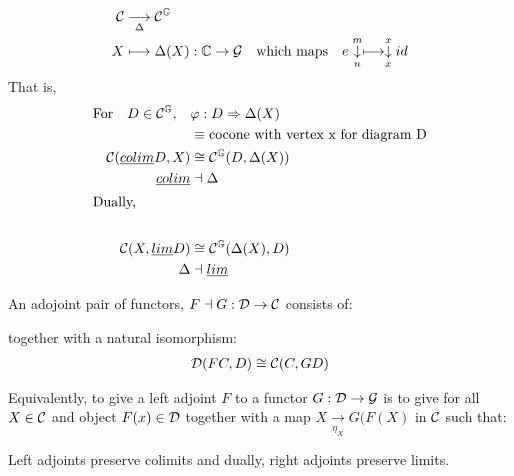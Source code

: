\begin{example}[Colimits]
  \begin{align*}
    \mathcal{C} &\underset{\Delta}{\longrightarrow} \mathcal{C}^\mathbb{G} \\ 
    X &\longmapsto \Delta(X): \mathbb{C} \to \mathcal{G} \quad 
    \textrm{which maps} \quad
    e \overset{m}{\underset{n}{\downarrow}} \longmapsto
    \overset{x}{\underset{x}{\downarrow}}id
  \end{align*} 
That is, 
  \begin{align*}
    \textrm{For} \quad D \in \mathcal{C}^\mathbb{G},  \quad
    &\varphi: D \Rightarrow \Delta(X) \\
    &\equiv \textrm{cocone with vertex x for diagram D} \\
    \mathcal{C}(\underline{colim}D, X) &\cong 
      \mathcal{C}^{\mathbb{G}}(D, \Delta(X)) \\ 
    \underline{colim} &\dashv \Delta \\ 
    \shortintertext{Dually,} \\ 
    \mathcal{C}(X, \underline{lim}D) &\cong
      \mathcal{C}^{\mathbb{G}}(\Delta(X), D) \\
    \Delta &\dashv \underline{lim}  
  \end{align*}

\end{example}

\begin{definition}
An adojoint pair of functors, $F \dashv G: \mathcal{D} \to \mathcal{C}$ consists
of: 
 \begin{center}
\end{center}
together with a natural isomorphism:
\begin{align*}
\mathcal{D}(F C, D) &\cong 
  \mathcal{C}(C, G D) \\ 
\end{align*}

Equivalently, to give a left adjoint $F$ to a functor 
$G: \mathcal{D} \to \mathcal{G}$
is to give for all $X \in \mathcal{C}$
and object $F(x) \in \mathcal{D}$
together with a map $X \underset{\eta_X}{\rightarrow} G(F(X)$
in $\mathcal{C} $
such that: 
\begin{center}
\end{center}
\end{definition}
\begin{proposition}
  Left adjoints preserve colimits and dually, right adjoints preserve limits.
\end{proposition}

